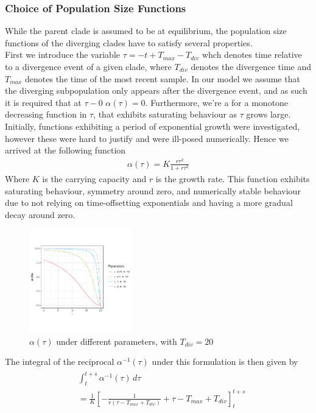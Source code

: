 \documentclass{ieeeaccess}
\theoremstyle{definition}
\begin{document}
\subsubsection{Choice of Population Size Functions} 
While the parent clade is assumed to be at equilibrium, the population size functions of the diverging clades have to satisfy several properties.\\
First we introduce the variable $\tau = -t + T_{max} - T_{div}$ whch denotes time relative to a divergence event of a given clade, where $T_{div}$ denotes the divergence time and $T_{max}$ denotes the time of the most recent sample.
In our model we assume that the diverging subpopulation only appears after the divergence event, and as such it is required that at $\tau-0$ $\alpha(\tau)=0$. Furthermore, we're a for a monotone decreasing function in $\tau$, that exhibits saturating behaviour as $\tau$ grows large.
Initially, functions exhibiting a period of exponential growth were investigated, however these were hard to justify and were ill-posed numerically.
Hence we arrived at the following function
\begin{gather}
\alpha(\tau) = K\frac{r\tau^2}{1+r\tau^2}
\end{gather} 
Where $K$ is the carrying capacity and $r$ is the growth rate.
This function  exhibits saturating behaviour, symmetry around zero, and numerically stable behaviour due to not relying on time-offsetting exponentials and having a more gradual decay around zero.\\
\begin{figure}[H]
  \centering
     \includegraphics[width=0.4\textwidth]{../R/alpha_plots}
    \caption{$\alpha(\tau)$ under different parameters, with $T_{div}=20$}
\end{figure}
The integral of the reciprocal $\alpha^{-1}(\tau)$ under this formulation is then given by 
\begin{gather}
\begin{aligned}
&\int_{t}^{t+s}\alpha^{-1}(\tau)\,d\tau\\ &= \frac{1}{K}\left[-\frac{1}{r(\tau-T_{max}+T_{div})}+\tau-T_{max}+T_{div}\right]_{t}^{t+s}
\end{aligned}
\end{gather}
\end{document}
